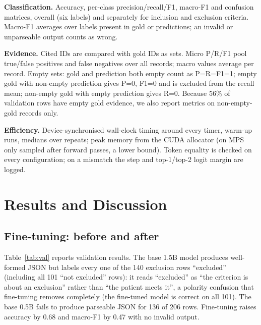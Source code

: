 \documentclass[conference]{IEEEtran}
\begin{document}
\textbf{Classification.} Accuracy, per-class precision/recall/F1, macro-F1 and confusion matrices, overall (six labels) and separately for inclusion and exclusion criteria. Macro-F1 averages over labels present in gold or predictions; an invalid or unparseable output counts as wrong.

\textbf{Evidence.} Cited IDs are compared with gold IDs as sets. Micro P/R/F1 pool true/false positives and false negatives over all records; macro values average per record. Empty sets: gold and prediction both empty count as P=R=F1=1; empty gold with non-empty prediction gives P=0, F1=0 and is excluded from the recall mean; non-empty gold with empty prediction gives R=0. Because 56\% of validation rows have empty gold evidence, we also report metrics on non-empty-gold records only.

\textbf{Efficiency.} Device-synchronised wall-clock timing around every timer, warm-up runs, medians over repeats; peak memory from the CUDA allocator (on MPS only sampled after forward passes, a lower bound). Token equality is checked on every configuration; on a mismatch the step and top-1/top-2 logit margin are logged.

\section{Results and Discussion}
\subsection{Fine-tuning: before and after}
Table~\ref{tab:val} reports validation results. The base 1.5B model produces well-formed JSON but labels every one of the 140 exclusion rows ``excluded'' (including all 101 ``not excluded'' rows): it reads ``excluded'' as ``the criterion is about an exclusion'' rather than ``the patient meets it'', a polarity confusion that fine-tuning removes completely (the fine-tuned model is correct on all 101). The base 0.5B fails to produce parseable JSON for 136 of 206 rows. Fine-tuning raises accuracy by 0.68 and macro-F1 by 0.47 with no invalid output.
\end{document}
